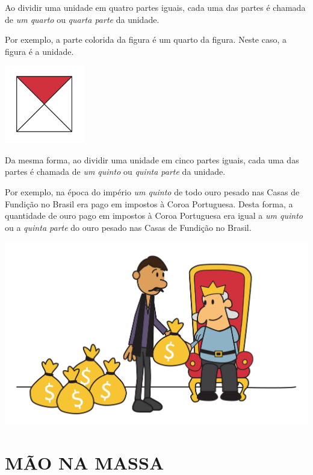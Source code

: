 Ao dividir uma unidade em quatro partes iguais, cada uma das partes é chamada de \textit{um quarto} ou \textit{quarta parte} da unidade.

Por exemplo, a parte colorida da figura é um quarto da figura. Neste caso, a figura é a unidade.

\begin{center}
    \includegraphics[width=100pt, keepaspectratio]{../figuras/licao01/orgideias_fig04.png}
  \end{center}
Da mesma forma, ao dividir uma unidade em cinco partes iguais, cada uma das partes é chamada de \textit{um quinto} ou \textit{quinta parte} da unidade.

Por exemplo, na época do império \emph{um quinto} de todo ouro pesado nas Casas de Fundição no Brasil era pago em impostos à Coroa Portuguesa. Desta forma, a quantidade de ouro pago em impostos à Coroa Portuguesa era igual a \emph{um quinto} ou a \emph{quinta parte} do ouro pesado nas Casas de Fundição no Brasil.

\begin{center}
    \includegraphics[width=400pt, keepaspectratio]{../figuras/licao01/orgideias_fig05.png}
  \end{center}

\section{MÃO NA MASSA }

